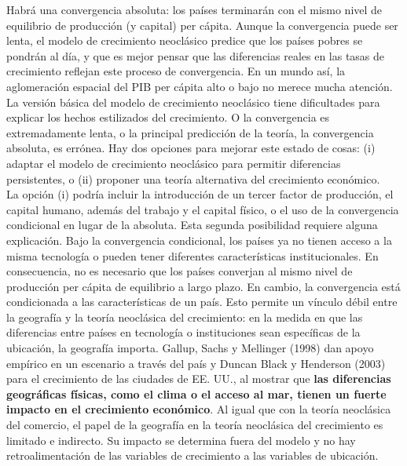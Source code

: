 Habrá una convergencia absoluta: los países terminarán con el mismo nivel de equilibrio de producción (y capital) per cápita. Aunque la convergencia puede ser lenta, el modelo de crecimiento neoclásico predice que los países pobres se pondrán al día, y que es mejor pensar que las diferencias reales en las tasas de crecimiento reflejan este proceso de convergencia. En un mundo así, la aglomeración espacial del PIB per cápita alto o bajo no merece mucha atención. La versión básica del modelo de crecimiento neoclásico tiene dificultades para explicar los hechos estilizados del crecimiento. O la convergencia es extremadamente lenta, o la principal predicción de la teoría, la convergencia absoluta, es errónea. Hay dos opciones para mejorar este estado de cosas: (i) adaptar el modelo de crecimiento neoclásico para permitir diferencias persistentes, o (ii) proponer una teoría alternativa del crecimiento económico.\\
La opción (i) podría incluir la introducción de un tercer factor de producción, el capital humano, además del trabajo y el capital físico, o el uso de la convergencia condicional en lugar de la absoluta. Esta segunda posibilidad requiere alguna explicación. Bajo la convergencia condicional, los países ya no tienen acceso a la misma tecnología o pueden tener diferentes características institucionales. En consecuencia, no es necesario que los países converjan al mismo nivel de producción per cápita de equilibrio a largo plazo. En cambio, la convergencia está condicionada a las características de un país. Esto permite un vínculo débil entre la geografía y la teoría neoclásica del crecimiento: en la medida en que las diferencias entre países en tecnología o instituciones sean específicas de la ubicación, la geografía importa. Gallup, Sachs y Mellinger (1998) dan apoyo empírico en un escenario a través del país y Duncan Black y Henderson (2003) para el crecimiento de las ciudades de EE. UU., al mostrar que \textbf{las diferencias geográficas físicas, como el clima o el acceso al mar, tienen un fuerte impacto en el crecimiento económico}. Al igual que con la teoría neoclásica del comercio, el papel de la geografía en la teoría neoclásica del crecimiento es limitado e indirecto. Su impacto se determina fuera del modelo y no hay retroalimentación de las variables de crecimiento a las variables de ubicación. \\
